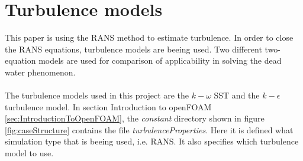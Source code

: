 \documentclass[a4paper, 12pt]{report}
\begin{document}
\section{Turbulence models}
This paper is using the RANS method to estimate turbulence. In order to close the RANS equations, turbulence models are beeing used. Two different two-equation models are used for comparison of applicability in solving the dead water phenomenon.\\
\\
The turbulence models used in this project are the $k-\omega$ SST and the $k-\epsilon$ turbulence model. In section Introduction to openFOAM \ref{sec:IntroductionToOpenFOAM}, the \textit{constant} directory shown in figure \ref{fig:caseStructure} contains the file \textit{turbulenceProperties}. Here it is defined what simulation type that is beeing used, i.e. RANS. It also specifies which turbulence model to use.
\end{document}
